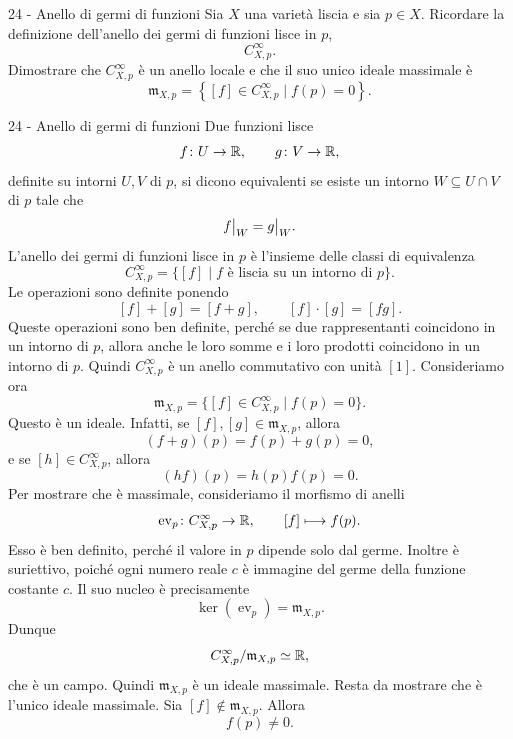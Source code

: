 \documentclass[a4paper]{article}
\begin{document}
\begin{snippetexercise}{24 - Anello di germi di funzioni}
    Sia \(X\) una varietà liscia e sia \(p\in X\). Ricordare la
    definizione dell'anello dei germi di funzioni lisce in \(p\),
    \[
        C^\infty_{X,p}.
    \]
    Dimostrare che \(C^\infty_{X,p}\) è un anello locale e che il suo
    unico ideale massimale è
    \[
        \mathfrak{m}_{X,p}
        =
        \left\{[f]\in C^\infty_{X,p}\mid f(p)=0\right\}.
    \]
\end{snippetexercise}

\begin{snippetsolution}{24 - Anello di germi di funzioni}
    Due funzioni lisce
    \[
        f\colon U\to\mathbb{R},
        \qquad
        g\colon V\to\mathbb{R},
    \]
    definite su intorni \(U,V\) di \(p\), si dicono equivalenti se esiste un intorno \(W\subseteq U\cap V\) di \(p\) tale che
    \[
        \restr{f}{W}=\restr{g}{W}.
    \]
    L'anello dei germi di funzioni lisce in \(p\) è l'insieme delle classi di equivalenza
    \[
        C^\infty_{X,p}
        =
        \{[f]\mid f \text{ è liscia su un intorno di }p\}.
    \]
    Le operazioni sono definite ponendo
    \[
        [f]+[g]=[f+g],
        \qquad
        [f]\cdot[g]=[fg].
    \]
    Queste operazioni sono ben definite, perché se due rappresentanti coincidono in un intorno di \(p\), allora anche le loro somme e i loro prodotti coincidono in un intorno di \(p\). Quindi \(C^\infty_{X,p}\) è un anello commutativo con unità \([1]\).
    Consideriamo ora
    \[
        \mathfrak{m}_{X,p}
        =
        \{[f]\in C^\infty_{X,p}\mid f(p)=0\}.
    \]
    Questo è un ideale. Infatti, se \([f],[g]\in\mathfrak{m}_{X,p}\), allora
    \[
        (f+g)(p)=f(p)+g(p)=0,
    \]
    e se \([h]\in C^\infty_{X,p}\), allora
    \[
        (hf)(p)=h(p)f(p)=0.
    \]
    Per mostrare che è massimale, consideriamo il morfismo di anelli
    \[
        \operatorname{ev}_p\colon C^\infty_{X,p}\to\mathbb{R},
        \qquad
        [f]\longmapsto f(p).
    \]
    Esso è ben definito, perché il valore in \(p\) dipende solo dal germe. Inoltre è suriettivo, poiché ogni numero reale \(c\) è immagine del germe della funzione costante \(c\). Il suo nucleo è precisamente
    \[
        \ker(\operatorname{ev}_p)=\mathfrak{m}_{X,p}.
    \]
    Dunque
    \[
        C^\infty_{X,p}/\mathfrak{m}_{X,p}\simeq\mathbb{R},
    \]
    che è un campo. Quindi \(\mathfrak{m}_{X,p}\) è un ideale massimale.
    Resta da mostrare che è l'unico ideale massimale. Sia \([f]\notin\mathfrak{m}_{X,p}\). Allora
    \[
        f(p)\neq0.
\]
\end{snippetsolution}
\end{document}
